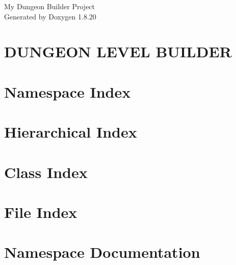 \let\mypdfximage\pdfximage\def\pdfximage{\immediate\mypdfximage}\documentclass[twoside]{book}
\newcommand{\+}{\discretionary{\mbox{\scriptsize$\hookleftarrow$}}{}{}}
\newcommand{\clearemptydoublepage}{%
  \newpage{\pagestyle{empty}\cleardoublepage}%
}
\begin{document}
\hypersetup{pageanchor=false,
             bookmarksnumbered=true,
             pdfencoding=unicode
            }
\begin{titlepage}
\vspace*{7cm}
\begin{center}%
{\Large My Dungeon Builder Project }\\
\vspace*{1cm}
{\large Generated by Doxygen 1.8.20}\\
\end{center}
\end{titlepage}
\clearemptydoublepage
{}
\tableofcontents
\clearemptydoublepage
{}
\hypersetup{pageanchor=true}

\chapter{D\+U\+N\+G\+E\+ON L\+E\+V\+EL B\+U\+I\+L\+D\+ER}
\label{index}\hypertarget{index}{}
\chapter{Namespace Index}

\chapter{Hierarchical Index}

\chapter{Class Index}

\chapter{File Index}

\chapter{Namespace Documentation}







\end{document}
